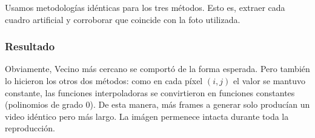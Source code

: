 Usamos metodolog\'ias id\'enticas para los tres m\'etodos. Esto es, extraer cada cuadro artificial y corroborar que coincide con la foto utilizada.

\subsubsection*{Resultado}

Obviamente, Vecino más cercano se comportó de la forma esperada. Pero también lo hicieron los otros dos métodos: como en cada p\'ixel $(i,j)$ el valor se mantuvo constante, las funciones interpoladoras se convirtieron en funciones constantes (polinomios de grado 0). De esta manera, más frames a generar solo producían un video idéntico pero más largo. La im\'agen permenece intacta durante toda la reproducci\'on.
